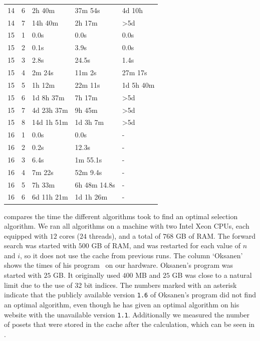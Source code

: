 \documentclass[twoside,leqno,twocolumn]{article}
\begin{document}
\begin{table}[!t]
\begin{tabular}{c|c|l|l|l}
    14  & 6   & 2h 40m           & 37m 54s           & 4d 10h           \\
    14  & 7   & 14h 40m          & 2h 17m            & >5d              \\
    \hline
    15  & 1   & 0.0s             & 0.0s              & 0.0s             \\
    15  & 2   & 0.1s             & 3.9s              & 0.0s             \\
    15  & 3   & 2.8s             & 24.5s             & 1.4s             \\
    15  & 4   & 2m 24s           & 11m 2s            & 27m 17s          \\
    15  & 5   & 1h 12m           & 22m 11s           & 1d 5h 40m        \\
    15  & 6   & 1d 8h 37m        & 7h 17m            & >5d              \\
    15  & 7   & 4d 23h 37m       & 9h 45m            & >5d              \\
    15  & 8   & 14d 1h 51m       & 1d 3h 7m          & >5d              \\
    \hline
    16  & 1   & 0.0s             & 0.0s              & -                \\
    16  & 2   & 0.2s             & 12.3s             & -                \\
    16  & 3   & 6.4s             & 1m 55.1s          & -                \\
    16  & 4   & 7m 22s           & 52m 9.4s          & -                \\
    16  & 5   & 7h 33m           & 6h 48m 14.8s      & -                \\
    16  & 6   & 6d 11h 21m       & 1d 1h 26m         & -                \\
  \end{tabular}
\end{table}

 compares the time the different algorithms took to find an optimal selection algorithm.
We ran all algorithms on a machine with two Intel Xeon CPUs, each equipped with $12$ cores ($24$ threads), and a total of $768$ GB of RAM.
The forward search was started with $500$ GB of RAM, and was restarted for each value of $n$ and $i$, so it does not use the cache from previous runs.
The column `Oksanen' shows the times of his program~\cite{Oksanen} on our hardware.
Oksanen's program was started with $25$ GB.
It originally used $400$ MB and $25$ GB was close to a natural limit due to the use of 32 bit indices.
The numbers marked with an asterisk indicate that the publicly available version \texttt{1.6} of Oksanen's program did not find an optimal algorithm, even though he has given an optimal algorithm on his website with the unavailable version \texttt{1.1}.
Additionally we measured the number of posets that were stored in the cache after the calculation, which can be seen in .
\end{document}
